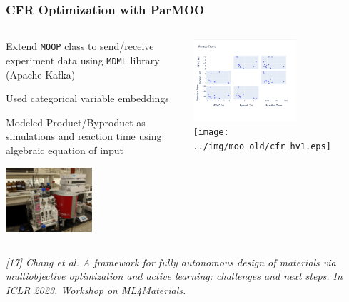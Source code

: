 \documentclass[aspectratio=169]{beamer}
\begin{document}
\begin{frame}\frametitle{CFR Optimization with ParMOO}

\begin{columns}
\begin{column}{0.5\textwidth}

\medskip
Extend {\tt MOOP} class to send/receive experiment data
using {\tt MDML} library (Apache Kafka)

\medskip
Used categorical variable embeddings

\medskip
Modeled Product/Byproduct as simulations and reaction time using algebraic
equation of input

\begin{center}
\includegraphics[width=0.5\textwidth]{../img/probs/cfr-nmr-setup.jpg}\\
\end{center}
\end{column}
\begin{column}{0.5\textwidth}
\begin{center}
\includegraphics[width=0.6\textwidth]{../img/moo_new/cfr_pareto_front.png}\\
\texttt{[image: ../img/moo\_old/cfr\_hv1.eps]}
\end{center}
\end{column}
\end{columns}

\vfill

{\tiny\it
[17] Chang et al.
A framework for fully autonomous design of materials via multiobjective optimization and active learning: challenges and next steps.
In {\sl ICLR 2023, Workshop on ML4Materials}.\\
}

\end{frame}
\end{document}
